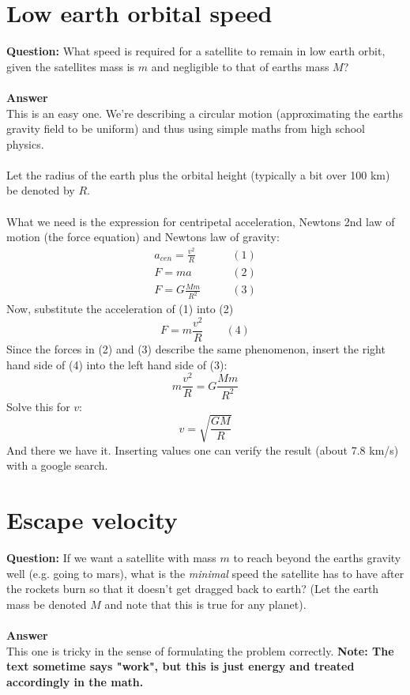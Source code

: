 \documentclass{article}
\begin{document}
\section*{Low earth orbital speed}
\textbf{Question:} What speed is required for a satellite to remain in low earth orbit, given the satellites mass is $m$ and negligible to that of earths mass $M$?
\\ \\
\textbf{Answer}
\\
This is an easy one. We're describing a circular motion (approximating the earths gravity field to be uniform) and thus using simple maths from high school physics. 
\\ \\
Let the radius of the earth plus the orbital height (typically a bit over 100 km) be denoted by $R$.
\\ \\
What we need is the expression for centripetal acceleration, Newtons 2nd law of motion (the force equation) and Newtons law of gravity:
\begin{equation*}
    \begin{split}
        a_{cen}=\frac{v^2}{R} \quad \quad &(1) \\
        F=ma  \quad \quad &(2)
        \\
        F=G\frac{Mm}{R^2} \quad \quad &(3)
    \end{split}
\end{equation*}
Now, substitute the acceleration of (1) into (2)
$$
F=m\frac{v^2}{R} \quad \quad (4)
$$
Since the forces in (2) and (3) describe the same phenomenon, insert the right hand side of (4) into the left hand side of (3):
$$
m\frac{v^2}{R}=G\frac{Mm}{R^2}
$$
Solve this for $v$:
$$
v=\sqrt{\frac{GM}{R}}
$$
And there we have it. Inserting values one can verify the result (about 7.8 km/s) with a google search.

\newpage
\section*{Escape velocity}
\textbf{Question:} If we want a satellite with mass $m$ to reach beyond the earths gravity well (e.g. going to mars), what is the \textit{minimal} speed the satellite has to have after the rockets burn so that it doesn't get dragged back to earth? (Let the earth mass be denoted $M$ and note that this is true for any planet).
\\ \\
\textbf{Answer}
\\
This one is tricky in the sense of formulating the problem correctly. \textbf{Note: The text sometime says "work", but this is just energy and treated accordingly in the math.}
\end{document}
